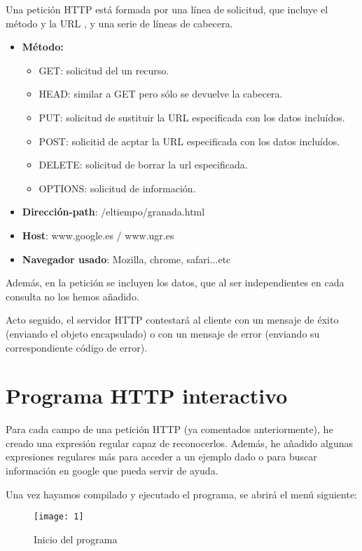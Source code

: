 	Una petición HTTP está formada por una línea de solicitud, que incluye el método y la URL , y una serie de líneas de cabecera.
	
	\begin{itemize}
		\item \textbf{Método:}
		\begin{itemize}
			\item GET: solicitud del un recurso.
			\item HEAD: similar a GET pero sólo se devuelve la cabecera.
			\item PUT: solicitud de sustituir la URL especificada con los datos incluídos.
			\item POST: solicitid de acptar la URL especificada con los datos incluídos.
			\item DELETE: solicitud de borrar la url especificada.
			\item OPTIONS: solicitud de información.
		\end{itemize}
		
		\item \textbf{Dirección-path}: /eltiempo/granada.html
		\item \textbf{Host}: www.google.es / www.ugr.es
		\item \textbf{Navegador usado}: Mozilla, chrome, safari...etc
	\end{itemize}
	
	Además, en la petición se incluyen los datos, que al ser independientes en cada consulta no los hemos añadido.
	
	Acto seguido, el servidor HTTP contestará al cliente con un mensaje de éxito (enviando el objeto encapsulado) o con un mensaje de error (enviando su correspondiente código de error).
	
	
	
	\newpage
	\section{Programa HTTP interactivo}
	
	Para cada campo de una petición HTTP (ya comentados anteriormente), he creado una expresión regular capaz de reconocerlos. Además, he añadido algunas expresiones regulares más para acceder a un ejemplo dado o para buscar información en google que pueda servir de ayuda.
	
	Una vez hayamos compilado y ejecutado el programa, se abrirá el menú siguiente:
	
	\begin{figure}[h]
		\centering
		\texttt{[image: 1]}
		\caption{Inicio del programa}
	\end{figure}
	
